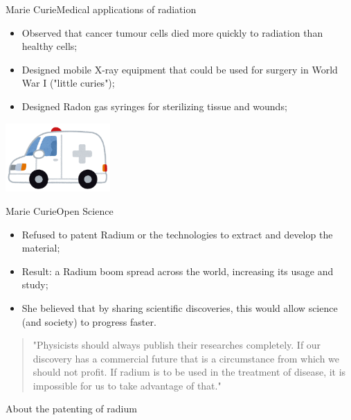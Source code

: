 \begin{frame}{Marie Curie}{Medical applications of radiation}
  \begin{itemize}
    \item Observed that cancer tumour cells died more quickly to radiation than healthy cells;
    \item Designed mobile X-ray equipment that could be used for surgery in World War I ("little curies");
    \item Designed Radon gas syringes for sterilizing tissue and wounds;
  \end{itemize}

  \hfill\includegraphics[width=0.3\textwidth]{../img/irasutoya_ambulance.png}
\end{frame} 

\begin{frame}[t]{Marie Curie}{Open Science}
  \begin{itemize}
    \item Refused to patent Radium or the technologies to extract and develop the material;
    \item Result: a Radium boom spread across the world, increasing its usage and study;
    \item She believed that by sharing scientific discoveries, this would allow science (and society) to progress faster.
  \end{itemize}

  \vfill
  \begin{quote}
    "Physicists should always publish their researches completely. If our discovery has a commercial future that is a circumstance from which we should not profit. If radium is to be used in the treatment of disease, it is impossible for us to take advantage of that." 
  \end{quote}
  \hfill About the patenting of radium
\end{frame}

